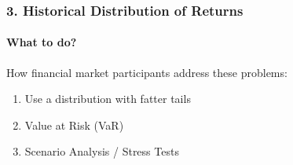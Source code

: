\documentclass{beamer}
\begin{document}
\begin{frame}[t]
    \frametitle{3. Historical Distribution of Returns}
    \framesubtitle{What to do?}

    How financial market participants address these problems:
    \begin{enumerate}
        \item Use a distribution with fatter tails
        \item Value at Risk (VaR)
        \item Scenario Analysis / Stress Tests
    \end{enumerate}

\end{frame}
\end{document}
